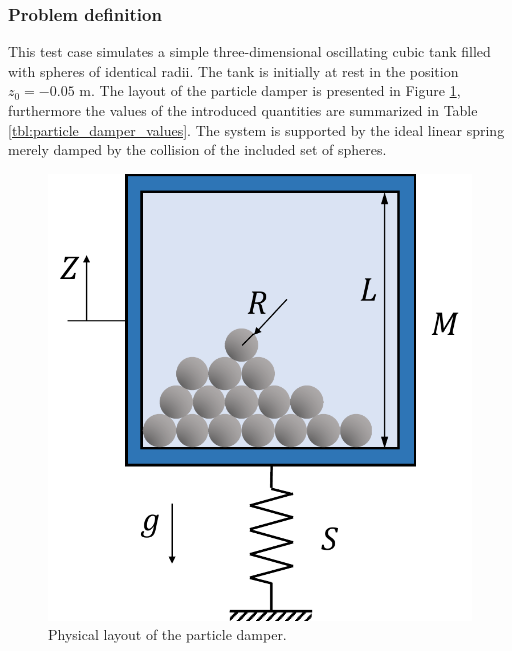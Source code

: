 \documentclass[a4paper,12pt,openany]{book}
\theoremstyle{break}
\begin{document}
\subsubsection{Problem definition}
This test case simulates a simple three-dimensional oscillating cubic tank filled with spheres of identical radii. The tank is initially at rest in the position $z_0=-0.05$ m. The layout of the particle damper is presented in Figure \ref{fig:particle_damper_geom}, furthermore the values of the introduced quantities are summarized in Table \ref{tbl:particle_damper_values}. The system is supported by the ideal linear spring  merely damped by the collision of the included set of spheres.
\begin{figure}[H]
  \includegraphics[scale=0.4]{particle_damper_geom.pdf}
  \centering
  \caption{Physical layout of the particle damper.}
  \label{fig:particle_damper_geom}
\end{figure}\vspace*{3pt}
\end{document}
